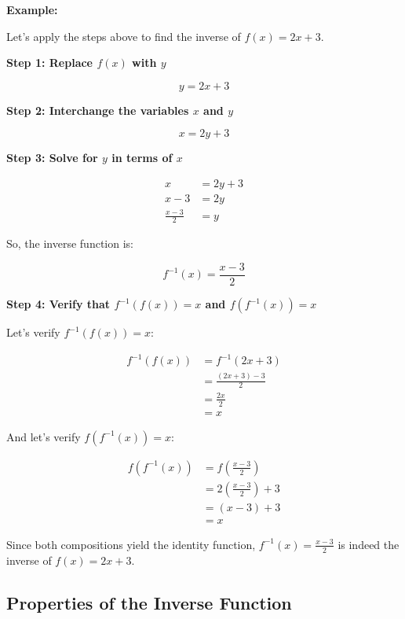 \textbf{Example:}

Let's apply the steps above to find the inverse of \(f (x) = 2x + 3\).

\textbf{Step 1: Replace \(f(x)\) with \(y\)}

\[
	y = 2x + 3
\]

\textbf{Step 2: Interchange the variables \(x\) and \(y\)}

\[
	x = 2y + 3
\]

\textbf{Step 3: Solve for \(y\) in terms of \(x\)}

\begin{align*}
	x               & = 2y + 3 \\
	x - 3           & = 2y     \\
	\frac{x - 3}{2} & = y
\end{align*}

So, the inverse function is:

\[
	f^{-1}(x) = \frac{x - 3}{2}
\]

\textbf{Step 4: Verify that \(f^{-1} (f (x)) = x\) and \(f(f^{-1} (x)) = x\)}

Let's verify \(f^{-1} (f (x)) = x\):

\begin{align*}
	f^{-1}(f(x)) & = f^{-1}(2x + 3)         \\
	             & = \frac{(2x + 3) - 3}{2} \\
	             & = \frac{2x}{2}           \\
	             & = x
\end{align*}

And let's verify \(f(f^{-1}(x)) = x\):

\begin{align*}
	f(f^{-1}(x)) & = f\left(\frac{x - 3}{2}\right)     \\
	             & = 2\left(\frac{x - 3}{2}\right) + 3 \\
	             & = (x - 3) + 3                       \\
	             & = x
\end{align*}

Since both compositions yield the identity function, \(f^{-1} (x) = \frac{x - 3}{2}\) is indeed the
inverse of \(f (x) = 2x + 3\).

\subsection{Properties of the Inverse Function}

